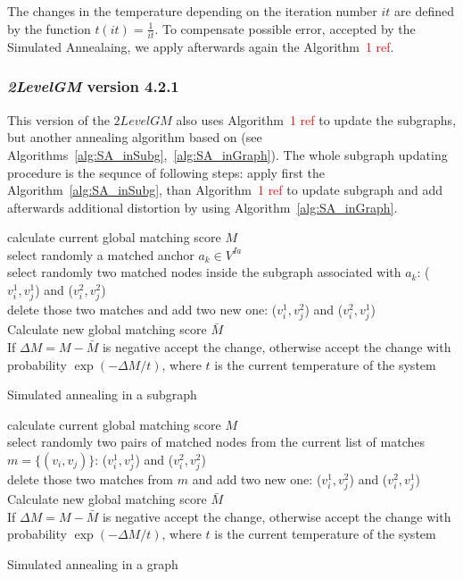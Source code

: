 \documentclass[
	fontsize=12pt,
	paper=a4,
	twoside=false,
	numbers=noenddot,
	plainheadsepline,
	toc=listof,
	toc=bibliography
]{scrartcl}
\newcommand\ToDo[1]{\textcolor{red}{#1}}
\begin{document}
The changes in the temperature depending on the iteration number $it$ are defined by the function $t(it) = \frac{1}{it}$.
To compensate possible error, accepted by the Simulated Annealaing, we apply afterwards again the Algorithm~\ToDo{1 ref}.

\subsubsection{\emph{2LevelGM} version 4.2.1}

This version of the $2LevelGM$ also uses Algorithm~\ToDo{1 ref} to update the subgraphs, but another annealing algorithm based on \cite{herault1990_SA} (see Algorithms~\ref{alg:SA_inSubg},~\ref{alg:SA_inGraph}). The whole subgraph updating procedure is the sequnce of following steps: apply first the Algorithm~\ref{alg:SA_inSubg}, than Algorithm~\ToDo{1 ref} to update subgraph and add afterwards additional distortion by using Algorithm~\ref{alg:SA_inGraph}.

\vspace{10pt}
\begin{algorithm}[H]
	\nl calculate current global matching score $M$ \\
	\nl select randomly a matched anchor $a_k\in V^{Ia}$ \\
	\nl select randomly two matched nodes inside the subgraph associated with $a_k$: ($v^1_i, v^1_j$) and
	($v^2_i, v^2_j$) \\
	\nl delete those two matches and add two new one: ($v^1_i, v^2_j$) and ($v^2_i, v^1_j$) \\
	\nl Calculate new global matching score $\bar{M}$ \\
	\nl If $\Delta M = M - \bar{M}$ is negative accept the change, otherwise accept the change with probability $\exp(-\Delta M/t)$, where $t$ is the current temperature of the system
	\caption{Simulated annealing in a subgraph}    \label{alg:SA_inSubg}
\end{algorithm}

\vspace{10pt}
\begin{algorithm}[H]
	\nl calculate current global matching score $M$ \\
	\nl select randomly two pairs of matched nodes from the current list of matches  $m = \{(v_i, v_j)\}$: ($v^1_i, v^1_j$) and
	($v^2_i, v^2_j$) \\
	\nl delete those two matches from $m$ and add two new one: ($v^1_i, v^2_j$) and ($v^2_i, v^1_j$) \\
	\nl Calculate new global matching score $\bar{M}$ \\
	\nl If $\Delta M = M - \bar{M}$ is negative accept the change, otherwise accept the change with probability $\exp(-\Delta M/t)$, where $t$ is the current temperature of the system
	\caption{Simulated annealing in a graph}    \label{alg:SA_inGraph}
\end{algorithm}
\end{document}
